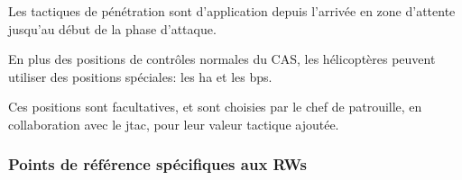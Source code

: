 \begin{e1}
	\item Les tactiques de pénétration sont d'application depuis l'arrivée en zone d'attente jusqu'au début de la phase d'attaque.
	\item En plus des positions de contrôles normales du CAS, les hélicoptères peuvent utiliser des positions spéciales: les \gls{ha} et les \glspl{bp}.
	\item Ces positions sont facultatives, et sont choisies par le chef de patrouille, en collaboration avec le \gls{jtac}, pour leur valeur tactique ajoutée.
\end{e1}

\subsubsection{Points de référence spécifiques aux RWs}

